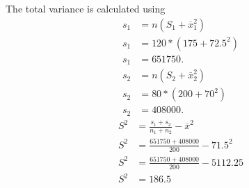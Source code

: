 \documentclass[11pt]{article}
\begin{document}
The total variance is calculated using
\begin{equation*}
  \begin{aligned}
    s_1 &= n(S_1 + \overline{x}^2_1) \\
    s_1 &= 120 * (175 + 72.5^2) \\
    s_1 &= 651750. \\
    s_2 &= n(S_2 + \overline{x}^2_2) \\
    s_2 &= 80 * (200 + 70^2) \\
    s_2 &= 408000.
  \end{aligned}
\end{equation*}
\begin{equation*}
  \begin{aligned}
    S^2 &= \frac{s_1 + s_2}{n_1 + n_2} - \overline{x}^2 \\
    S^2 &= \frac{651750 + 408000}{200} - 71.5^2 \\
    S^2 &= \frac{651750 + 408000}{200} - 5112.25 \\
    S^2 &= 186.5
  \end{aligned}
\end{equation*}
\end{document}
